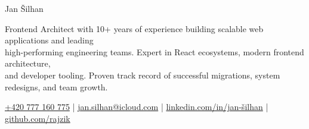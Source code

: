\documentclass[a4paper, 10pt]{article}
\begin{document}
\begin{center}
  {\fontsize{30pt}{30pt}\selectfont {}\selectfont Jan Šilhan}
\end{center}

\begin{justify}
  \noindent
Frontend Architect with 10+ years of experience building scalable web applications
and leading \\high-performing engineering teams. Expert in React ecosystems, modern
frontend architecture, \\and developer tooling. Proven track record of successful
migrations, system redesigns, and team growth.
\vspace{2pt}

\end{justify}

\begin{center}
  \noindent
  {\GeistMono \fontsize{9pt}{9pt}\selectfont \href{tel:+420777160775}{+420 777 160 775}}  %
  {\GeistMono |}
  {\GeistMono \fontsize{9pt}{9pt}\selectfont \href{mailto:jan.silhan@icloud.com}{jan.silhan@icloud.com}}  %
  {\GeistMono |}
  {\GeistMono \fontsize{9pt}{9pt}\selectfont \href{https://www.linkedin.com/in/jan-%C5%A1ilhan/}{linkedin.com/in/jan-šilhan}}  %
  {\GeistMono |}
  {\GeistMono \fontsize{9pt}{9pt}\selectfont \href{https://github.com/rajzik}{github.com/rajzik}}  %
  \vspace{4pt}
\end{center}
\vspace{8pt}
\end{document}
